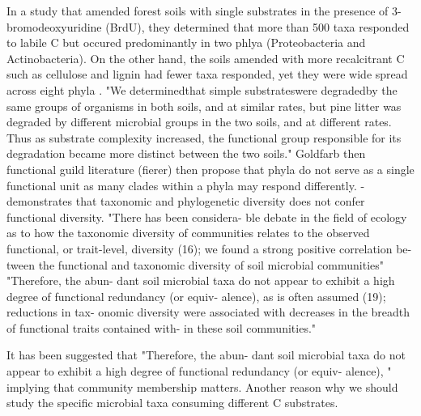 In a study that amended forest soils with single substrates in the presence of 3-bromodeoxyuridine (BrdU), they determined that more than 500 taxa responded to labile C but occured predominantly in two phlya (Proteobacteria and Actinobacteria)\cite{Goldfarb_2011}. On the other hand, the soils amended with more recalcitrant C such as cellulose and lignin had fewer taxa responded, yet they were wide spread across eight phyla \cite{Goldfarb_2011}. "We determinedthat simple substrateswere degradedby the same groups of organisms in both soils, and at similar rates, but pine litter was degraded by different microbial groups in the two soils, and at different rates. Thus as substrate complexity increased, the functional group responsible for its degradation became more distinct between the two soils."\cite{Waldrop_2004}
Goldfarb then functional guild literature (fierer) then propose that phyla do not serve as a single functional unit as many clades within a phyla may respond differently.    
\cite{Fierer_2012} - demonstrates that taxonomic and phylogenetic diversity does not confer functional diversity.  "There has been considera- ble debate in the field of ecology as to how the taxonomic diversity of communities relates to the observed functional, or trait-level, diversity (16); we found a strong positive correlation be- tween the functional and taxonomic diversity of soil microbial communities"\cite{Fierer_2013}
"Therefore, the abun- dant soil microbial taxa do not appear to exhibit a high degree of functional redundancy (or equiv- alence), as is often assumed (19); reductions in tax- onomic diversity were associated with decreases in the breadth of functional traits contained with- in these soil communities."\cite{Fierer_2013} 

It has been suggested that "Therefore, the abun- dant soil microbial taxa do not appear to exhibit a high degree of functional redundancy (or equiv- alence), "\cite{Fierer_2013} implying that community membership matters.  Another reason why we should study the specific microbial taxa consuming different C substrates.  
 
